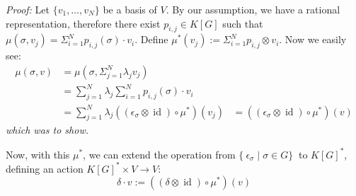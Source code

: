 \textit{Proof:} Let $\{ v_1 , \ldots , v_N \}$ be a basis of $V$.
By our assumption, we have a rational representation, therefore there exist $p_{i,j} \in K \left\lbrack G \right\rbrack$ such that $\mu\left( \sigma, v_j \right) = \Sigma_{i=1}^{N} p_{i,j}\left(\sigma\right) \cdot v_i$.
Define $\mu^\ast \left( v_j \right) := \Sigma_{i=1}^{N} p_{i,j} \otimes v_i$.
Now we easily see:
\begin{equation}
  \begin{aligned}
    \mu\left(\sigma,v\right)
    &= \mu \left(\sigma, \Sigma_{j=1}^N \lambda_j v_j \right) \\
    &= \sum_{j=1}^N \lambda_j  \sum_{i=1}^N p_{i,j}\left(\sigma\right) \cdot v_i \\
    &= \sum_{j=1}^N \lambda_j \left(\left(\epsilon_\sigma \otimes \operatorname{id} \right) \circ \mu^\ast \right) \left(v_j \right)
    &= \left(\left(\epsilon_\sigma \otimes \operatorname{id} \right) \circ \mu^\ast \right) \left(v \right)
  \end{aligned}
\end{equation}
\textit{which was to show.}

\smallskip
Now, with this $\mu^\ast$, we can extend the operation from $\{\ \epsilon_\sigma \mid \sigma \in G \}\ $ to $K \left\lbrack G \right\rbrack^\ast$, defining an action $K \left\lbrack G \right\rbrack^\ast \times V \longrightarrow V$:
\begin{equation}
  \delta \cdot v := \left(\left( \delta \otimes \operatorname{id} \right) \circ \mu^\ast \right) \left(v\right)
\end{equation}
